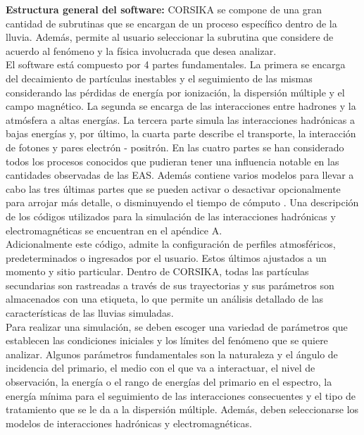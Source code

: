 \textbf{Estructura general del software:} CORSIKA se compone de una gran cantidad de subrutinas que se encargan de un proceso específico dentro de la lluvia.  Además, permite al usuario seleccionar la subrutina que considere de acuerdo al fenómeno y la física involucrada que desea analizar.\\

El software está compuesto por 4 partes fundamentales. La primera se encarga del decaimiento de partículas inestables y el seguimiento de las mismas considerando las pérdidas de energía por ionización, la dispersión múltiple y el campo magnético. La segunda se encarga de las interacciones entre hadrones y la atmósfera a altas energías. La tercera parte simula las interacciones hadrónicas a bajas energías y, por último, la cuarta parte describe el transporte, la interacción de fotones y pares electrón - positrón. En las cuatro partes se han considerado todos los procesos conocidos que pudieran tener una influencia notable en las cantidades observadas de las EAS. Además contiene varios modelos para llevar a cabo las tres últimas partes que se pueden activar o desactivar opcionalmente para arrojar más detalle, o disminuyendo el tiempo de cómputo \cite{Heck1998}. Una descripción de los códigos utilizados para la simulación de las interacciones hadrónicas y electromagnéticas se encuentran en el apéndice A.\\

Adicionalmente este código, admite la configuración de perfiles atmosféricos, predeterminados o ingresados por el usuario. Estos últimos ajustados a un momento y sitio particular. Dentro de CORSIKA, todas las partículas secundarias son rastreadas a través de sus trayectorias y sus parámetros son almacenados con una etiqueta, lo que permite un análisis detallado de las características de las lluvias simuladas.\\

Para realizar una simulación, se deben escoger una variedad de parámetros que establecen las condiciones iniciales y los límites del fenómeno que se quiere analizar. Algunos parámetros fundamentales son la naturaleza y el ángulo de incidencia del primario, el medio con el que va a interactuar, el nivel de observación, la energía o el rango de energías del primario en el espectro, la energía mínima para el seguimiento de las interacciones consecuentes y el tipo de tratamiento que se le da a la dispersión múltiple. Además, deben seleccionarse los modelos de interacciones hadrónicas y electromagnéticas.\\

